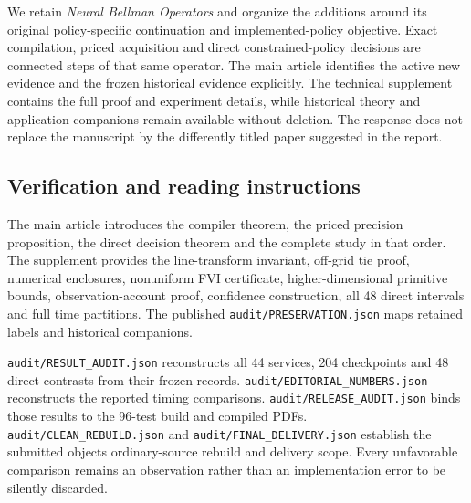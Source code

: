 \documentclass[ecta,nameyear,draft]{econsocart}
\begin{document}
We retain \emph{Neural Bellman Operators} and organize the additions
around its original policy-specific continuation and implemented-policy
objective. Exact compilation, priced acquisition and direct
constrained-policy decisions are connected steps of that same operator.
The main article identifies the active new evidence and the frozen
historical evidence explicitly. The technical supplement contains the
full proof and experiment details, while historical theory and
application companions remain available without deletion. The response
does not replace the manuscript by the differently titled paper
suggested in the report.

\hypertarget{verification-and-reading-instructions}{%
\subsection{Verification and reading
instructions}\label{verification-and-reading-instructions}}

The main article introduces the compiler theorem, the priced precision
proposition, the direct decision theorem and the complete study in that
order. The supplement provides the line-transform invariant, off-grid
tie proof, numerical enclosures, nonuniform FVI certificate,
higher-dimensional primitive bounds, observation-account proof,
confidence construction, all 48 direct intervals and full time
partitions. The published \nolinkurl{audit/PRESERVATION.json} maps retained
labels and historical companions.

\nolinkurl{audit/RESULT_AUDIT.json} reconstructs all 44 services, 204
checkpoints and 48 direct contrasts from their frozen records.
\nolinkurl{audit/EDITORIAL_NUMBERS.json} reconstructs the reported timing
comparisons. \nolinkurl{audit/RELEASE_AUDIT.json} binds those results to
the 96-test build and compiled PDFs. \nolinkurl{audit/CLEAN_REBUILD.json}
and \nolinkurl{audit/FINAL_DELIVERY.json} establish the submitted
object\textquotesingle s ordinary-source rebuild and delivery scope.
Every unfavorable comparison remains an observation rather than an
implementation error to be silently discarded.
\end{document}
